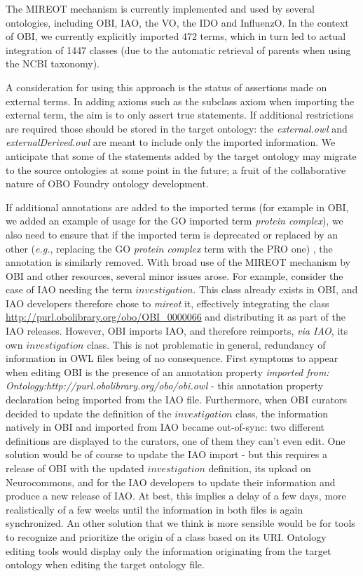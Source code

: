 \documentclass{ao2e}%
\begin{document}
The \ac{MIREOT} mechanism is currently  implemented and used by several ontologies, including  \ac{OBI},  \ac{IAO}\cite{IAO}, the \ac{VO}\cite{VO}, the \ac{IDO}\cite{IDO} and  \ac{InfluenzO}\cite{InfluenzO}.
In the context of \ac{OBI}, we currently explicitly imported 472 terms, which in turn led to actual integration of 1447 classes (due to the automatic retrieval of parents when using the NCBI taxonomy). 

A consideration for using this approach is the status of assertions made on external terms.
In adding axioms such as the subclass axiom when importing the external term, the aim is to only assert true statements.
If additional restrictions are required those should be stored in the target ontology: the \emph{external.owl} and \emph{externalDerived.owl} are meant to include only the imported information.
We anticipate that some of the statements added by the target ontology may migrate to the source ontologies at some point in the future; a fruit of the collaborative nature of OBO Foundry ontology development. 

If additional annotations are added to the imported terms (for example in \ac{OBI}, we added an example of usage for the \ac{GO} imported term \textit{protein complex}), we also need to ensure that if the imported term is deprecated or replaced by an other (\emph{e.g.}, replacing  the \ac{GO} \textit{protein complex} term with the \ac{PRO} one)
, the annotation is similarly removed. 
With broad use of the MIREOT mechanism by OBI and other resources, several minor issues arose.
For example, consider the case of \ac{IAO} needing the term $investigation$.  This class already exists in \ac{OBI}, and \ac{IAO} developers therefore chose to \emph{mireot} it, effectively integrating the class \url{http://purl.obolibrary.org/obo/OBI_0000066} and distributing it as part of the \ac{IAO} releases.
However, \ac{OBI} imports \ac{IAO}, and therefore reimports, \emph{via IAO}, its own $investigation$ class. This is not problematic in general, redundancy of information in OWL files being of no consequence. First symptoms to appear when editing \ac{OBI} is the presence of an annotation property \emph{imported from: Ontology:http://purl.obolibrary.org/obo/obi.owl} - this annotation property declaration being imported from the IAO file.
Furthermore, when \ac{OBI} curators decided to update the definition of the $investigation$ class, the information natively in \ac{OBI} and imported from \ac{IAO} became out-of-sync: two different definitions are displayed to the curators, one of them they can't even edit.
One solution would be of course to update the \ac{IAO} import - but this requires a release of \ac{OBI} with the updated $investigation$ definition, its upload on Neurocommons, and for the \ac{IAO} developers to update their information and produce a new release of \ac{IAO}. At best, this implies a delay of a few days, more realistically of a few weeks until the information in both files is again synchronized.
An other solution that we think is more sensible would be for tools to recognize and prioritize the origin of a class based on its URI. Ontology editing tools would display only the information originating from the target ontology when editing the target ontology file.
\end{document}
